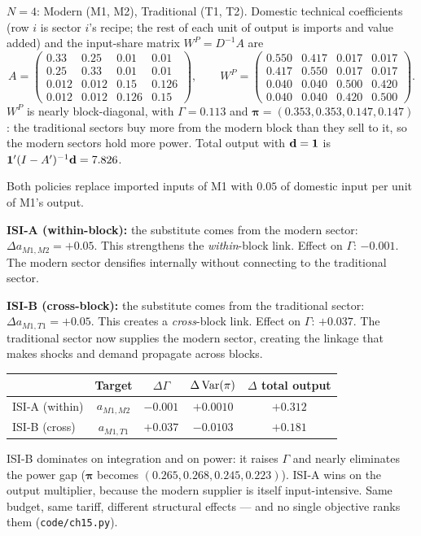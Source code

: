 \documentclass[../structural_economics_book.tex]{subfiles}
\begin{document}
\begin{example}\label{ch15:ex:isi}
$N = 4$: Modern (M1, M2), Traditional (T1, T2). Domestic technical coefficients (row $i$ is sector $i$'s recipe; the rest of each unit of output is imports and value added) and the input-share matrix $W^P = D^{-1}A$ are
\[
A = \begin{pmatrix}
0.33 & 0.25 & 0.01 & 0.01 \\
0.25 & 0.33 & 0.01 & 0.01 \\
0.012 & 0.012 & 0.15 & 0.126 \\
0.012 & 0.012 & 0.126 & 0.15
\end{pmatrix}, \qquad
W^P = \begin{pmatrix}
0.550 & 0.417 & 0.017 & 0.017 \\
0.417 & 0.550 & 0.017 & 0.017 \\
0.040 & 0.040 & 0.500 & 0.420 \\
0.040 & 0.040 & 0.420 & 0.500
\end{pmatrix}.
\]
$W^P$ is nearly block-diagonal, with $\Gamma = 0.113$ and $\boldsymbol{\pi} = (0.353, 0.353, 0.147, 0.147)$: the traditional sectors buy more from the modern block than they sell to it, so the modern sectors hold more power. Total output with $\mathbf{d} = \mathbf{1}$ is $\mathbf{1}'(I - A')^{-1}\mathbf{d} = 7.826$.

Both policies replace imported inputs of M1 with $0.05$ of domestic input per unit of M1's output.

\textbf{ISI-A (within-block):} the substitute comes from the modern sector: $\Delta a_{M1, M2} = +0.05$. This strengthens the \textit{within}-block link. Effect on $\Gamma$: $-0.001$. The modern sector densifies internally without connecting to the traditional sector.

\textbf{ISI-B (cross-block):} the substitute comes from the traditional sector: $\Delta a_{M1, T1} = +0.05$. This creates a \textit{cross}-block link. Effect on $\Gamma$: $+0.037$. The traditional sector now supplies the modern sector, creating the linkage that makes shocks and demand propagate across blocks.

\begin{center}
\begin{tabular}{lcccc}
\toprule
& Target & $\Delta\Gamma$ & $\Delta\operatorname{Var}(\pi)$ & $\Delta$ total output \\
\midrule
ISI-A (within) & $a_{M1,M2}$ & $-0.001$ & $+0.0010$ & $+0.312$ \\
ISI-B (cross) & $a_{M1,T1}$ & $+0.037$ & $-0.0103$ & $+0.181$ \\
\bottomrule
\end{tabular}
\end{center}

ISI-B dominates on integration and on power: it raises $\Gamma$ and nearly eliminates the power gap ($\boldsymbol{\pi}$ becomes $(0.265, 0.268, 0.245, 0.223)$). ISI-A wins on the output multiplier, because the modern supplier is itself input-intensive. Same budget, same tariff, different structural effects --- and no single objective ranks them (\texttt{code/ch15.py}).
\end{example}
\end{document}
